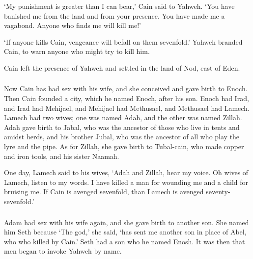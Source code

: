 `My punishment is greater than I can bear,'
Cain said to Yahweh.
`You have banished me from the land
and from your presence. 
You have made me a vagabond.
Anyone who finds me will kill me!'

`If anyone kills Cain, vengeance will befall on them sevenfold.'
Yahweh branded Cain, to warn anyone who might try to kill him.

Cain left the presence of Yahweh
and settled in the land of Nod, east of Eden.

\subsubsection{\secsep}

 Now Cain has had sex with his wife,
and she conceived and gave birth to Enoch.
Then Cain founded a city, 
which he named Enoch,
after his son.
Enoch had Irad, 
and Irad had Mehijael,
and Mehijael had Methusael,
and Methusael had Lamech.
Lamech had two wives; 
one was named Adah,
and the other was named Zillah.
Adah gave birth to Jabal,
who was the ancestor of those 
who live in tents and amidst herds,
and his brother Jubal, 
who was the ancestor of 
all who play the lyre and the pipe.
As for Zillah, 
she gave birth to Tubal-cain,
who made copper and iron tools,
and his sister Naamah.

One day, Lamech said to his wives,
`Adah and Zillah, hear my voice.
Oh wives of Lamech, listen to my words.
I have killed a man for wounding me
and a child for bruising me.
If Cain is avenged sevenfold,
than Lamech is avenged seventy-sevenfold.'

\subsubsection{\secsep}

 Adam had sex with his wife again, 
and she gave birth to another son.
She named him Seth because `The god,' she said,
`has sent me another son in place of Abel,
who who killed by Cain.'
Seth had a son who he named Enosh.
It was then that men began to invoke Yahweh by name.